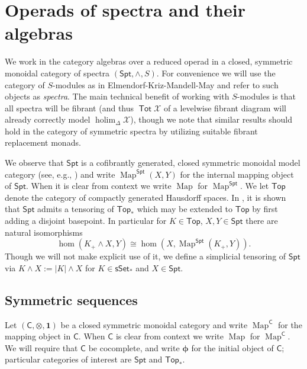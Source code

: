 \documentclass[11pt]{amsart}
\theoremstyle{definition}
\theoremstyle{remark}
\newcommand{\Top}{\mathsf{Top}_*}
\newcommand{\Spt}{\mathsf{Spt}}
\newcommand{\Sp}{\Sigma^{\infty}}
\newcommand{\Tot}{\operatorname{\mathsf{Tot}}}
\newcommand{\holim}{\operatorname{holim}}
\newcommand{\Map}{\operatorname{Map}}
\newcommand{\Cal}[1]{\mathcal{#1}}
\newcommand{\CGH}{\mathsf{CGHaus}}
\newcommand{\ptC}{\pmb{\phi}}
\begin{document}
\section{Operads of spectra and their algebras}
We work in the category algebras over a reduced operad in a closed, symmetric monoidal category of spectra $(\Spt, \wedge, S)$. For convenience we will use the category of $S$-modules as in Elmendorf-Kriz-Mandell-May \cite{EKMM} and refer to such objects as \textit{spectra}. The main technical benefit of working with $S$-modules is that all spectra will be fibrant (and thus $\Tot \Cal{X}$ of a levelwise fibrant diagram will already correctly model $\holim_{\Delta} \Cal{X}$), though we note that similar results should hold in the category of symmetric spectra by utilizing suitable fibrant replacement monads. 

We observe that $\Spt$ is a cofibrantly generated, closed symmetric monoidal model category (see, e.g.,  \cite[Definition 1.12]{AC-1}) and write $\Map^{\Spt}(X,Y)$ for the internal mapping object of $\Spt$. When it is clear from context we write $\Map$ for $\Map^{\Spt}$. We let $\mathsf{Top}$ denote the category of compactly generated Hausdorff spaces. In \cite{EKMM}, it is shown that $\Spt$ admits a tensoring of $\Top$ which may be extended to $\mathsf{Top}$ by first adding a disjoint basepoint. In particular for $K\in \mathsf{Top}$, $X,Y\in \Spt$ there are natural isomorphisms \[\hom(K_+ \wedge X, Y)\cong \hom(X, \Map^{\Spt} (K_+, Y)).\]  Though we will not make explicit use of it, we define a simplicial tensoring of $\Spt$ via $K\wedge X:=|K|\wedge X$ for $K\in \mathsf{sSet}_*$ and $X\in \Spt$. %



\subsection{Symmetric sequences}
\label{sec:comp-prod-rmks} Let $(\mathsf{C}, \otimes, \mathbf{1})$ be a closed symmetric monoidal category and write $\Map^{\mathsf{C}}$ for the mapping object in $\mathsf{C}$. When $\mathsf{C}$ is clear from context we write $\Map$ for $\Map^{\mathsf{C}}$. We will require that $\mathsf{C}$ be cocomplete, and write $\ptC$ for the initial object of $\mathsf{C}$; particular categories of interest are $\Spt$ and $\Top$.
\end{document}
